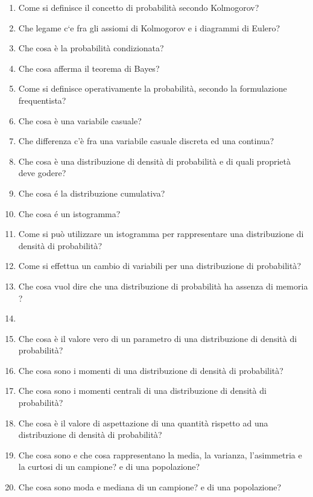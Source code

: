 \begin{enumerate}
	\item Come si definisce il concetto di probabilità secondo Kolmogorov?
	\item Che legame c`{e} fra gli assiomi di Kolmogorov e i diagrammi di Eulero?
	\item Che cosa \`{e} la probabilità condizionata?
	\item Che cosa afferma il teorema di Bayes?
	\item Come si definisce operativamente la probabilit\`{a}, secondo la formulazione frequentista? 
	\item Che cosa \`{e} una variabile casuale?
	\item Che differenza c'è fra una variabile casuale discreta ed una continua?
	\item Che cosa \`{e} una distribuzione di densit\`{a} di probabilit\`{a} e di quali propriet\`{a} deve godere?
	\item Che cosa \'{e} la distribuzione cumulativa?
	\item Che cosa \'{e} un istogramma?
	\item Come si pu\`{o} utilizzare un istogramma per rappresentare una distribuzione di densit\`{a} di probabilit\`{a}?
	\item Come si effettua un cambio di variabili per una distribuzione di probabilit\`{a}?
	\item Che cosa vuol dire che una distribuzione di probabilit\`{a} ha assenza di memoria ?
	\item \item Che cosa \`{e} il valore vero di un parametro di una distribuzione di densit\`{a} di probabilit\`{a}?
	\item Che cosa sono i momenti di una distribuzione di densit\`{a} di probabilit\`{a}?
	\item Che cosa sono i momenti centrali di una distribuzione di densit\`{a} di probabilit\`{a}?
	\item Che cosa è il valore di aspettazione di una quantit\`{a} rispetto ad una distribuzione di densit\`{a} di probabilit\`{a}?
	\item Che cosa sono e che cosa rappresentano la media, la varianza, l'asimmetria e la curtosi di un campione? e di una popolazione?
	\item Che cosa sono moda e mediana di un campione? e di una popolazione?


\end{enumerate}

